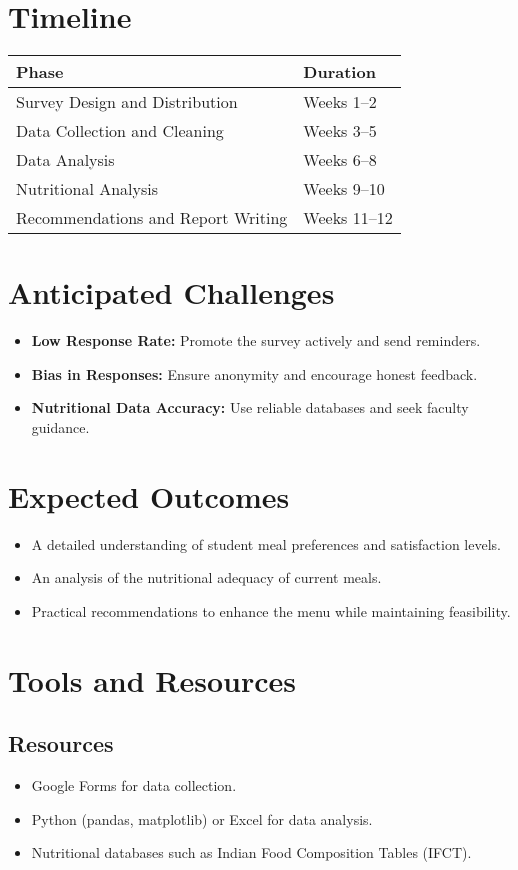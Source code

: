 \documentclass[12pt,a4paper]{article}
\begin{document}
\section{Timeline}
\begin{tabular}{|l|l|}
\hline
\textbf{Phase} & \textbf{Duration} \\
\hline
Survey Design and Distribution & Weeks 1--2 \\
Data Collection and Cleaning & Weeks 3--5 \\
Data Analysis & Weeks 6--8 \\
Nutritional Analysis & Weeks 9--10 \\
Recommendations and Report Writing & Weeks 11--12 \\
\hline
\end{tabular}

\section{Anticipated Challenges}
\begin{itemize}
    \item \textbf{Low Response Rate:} Promote the survey actively and send reminders.
    \item \textbf{Bias in Responses:} Ensure anonymity and encourage honest feedback.
    \item \textbf{Nutritional Data Accuracy:} Use reliable databases and seek faculty guidance.
\end{itemize}

\section{Expected Outcomes}
\begin{itemize}
    \item A detailed understanding of student meal preferences and satisfaction levels.
    \item An analysis of the nutritional adequacy of current meals.
    \item Practical recommendations to enhance the menu while maintaining feasibility.
\end{itemize}

\section{Tools and Resources}
\subsection{Resources}
\begin{itemize}
    \item Google Forms for data collection.
    \item Python (pandas, matplotlib) or Excel for data analysis.
    \item Nutritional databases such as Indian Food Composition Tables (IFCT).
\end{itemize}
\end{document}
